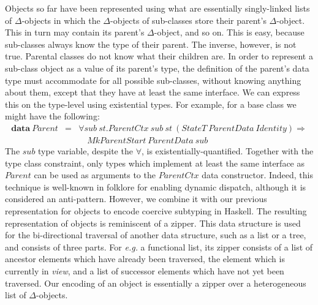 Objects so far have been represented using what are essentially singly-linked lists of $\Delta$-objects in which the $\Delta$-objects of sub-classes store their parent's $\Delta$-object. This in turn may contain its parent's $\Delta$-object, and so on. This is easy, because sub-classes always know the type of their parent. The inverse, however, is not true. Parental classes do not know what their children are. In order to represent a sub-class object as a value of its parent's type, the definition of the parent's data type must accommodate for all possible sub-classes, without knowing anything about them, except that they have at least the same interface. We can express this on the type-level using existential types. For example, for a base class we might have the following:
\begin{displaymath}
\begin{array}{lcl}
\mathbf{data}~\mathit{Parent} & = & \forall \mathit{sub}~\mathit{st}.\mathit{ParentCtx}~\mathit{sub}~\mathit{st}~(\mathit{StateT}~\mathit{ParentData}~\mathit{Identity}) \Rightarrow \\
&& \quad\mathit{MkParentStart}~\mathit{ParentData}~\mathit{sub}
\end{array}
\end{displaymath}
The $\mathit{sub}$ type variable, despite the $\forall$, is existentially-quantified. Together with the type class constraint, only types which implement at least the same interface as $\mathit{Parent}$ can be used as arguments to the $\mathit{ParentCtx}$ data constructor. Indeed, this technique is well-known in folklore for enabling dynamic dispatch, although it is considered an anti-pattern. However, we combine it with our previous representation for objects to encode coercive subtyping in Haskell. The resulting representation of objects is reminiscent of a zipper\cite{huet1997zipper}. This data structure is used for the bi-directional traversal of another data structure, such as a list or a tree, and consists of three parts. For \emph{e.g.} a functional list, its zipper consists of a list of ancestor elements which have already been traversed, the element which is currently in \emph{view}, and a list of successor elements which have not yet been traversed. Our encoding of an object is essentially a zipper over a heterogeneous list of $\Delta$-objects. 

